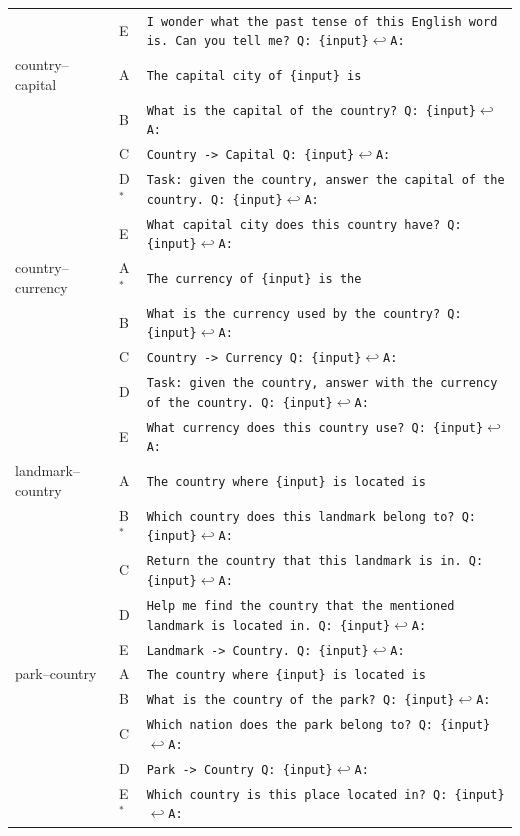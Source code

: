 {\begin{longtable}{@{}ll>{\raggedright\arraybackslash}p{}@{}}
 & E & \texttt{I wonder what the past tense of this English word is. Can you tell me? Q: \{input\}$\hookleftarrow$A:} \\[3pt]
country--capital & A & \texttt{The capital city of \{input\} is} \\
 & B & \texttt{What is the capital of the country? Q: \{input\}$\hookleftarrow$A:} \\
 & C & \texttt{Country -> Capital Q: \{input\}$\hookleftarrow$A:} \\
 & D$^\ast$ & \texttt{Task: given the country, answer the capital of the country. Q: \{input\}$\hookleftarrow$A:} \\
 & E & \texttt{What capital city does this country have? Q: \{input\}$\hookleftarrow$A:} \\[3pt]
country--currency & A$^\ast$ & \texttt{The currency of \{input\} is the} \\
 & B & \texttt{What is the currency used by the country? Q: \{input\}$\hookleftarrow$A:} \\
 & C & \texttt{Country -> Currency Q: \{input\}$\hookleftarrow$A:} \\
 & D & \texttt{Task: given the country, answer with the currency of the country. Q: \{input\}$\hookleftarrow$A:} \\
 & E & \texttt{What currency does this country use? Q: \{input\}$\hookleftarrow$A:} \\[3pt]
landmark--country & A & \texttt{The country where \{input\} is located is} \\
 & B$^\ast$ & \texttt{Which country does this landmark belong to? Q: \{input\}$\hookleftarrow$A:} \\
 & C & \texttt{Return the country that this landmark is in. Q: \{input\}$\hookleftarrow$A:} \\
 & D & \texttt{Help me find the country that the mentioned landmark is located in. Q: \{input\}$\hookleftarrow$A:} \\
 & E & \texttt{Landmark -> Country. Q: \{input\}$\hookleftarrow$A:} \\[3pt]
park--country & A & \texttt{The country where \{input\} is located is} \\
 & B & \texttt{What is the country of the park? Q: \{input\}$\hookleftarrow$A:} \\
 & C & \texttt{Which nation does the park belong to? Q: \{input\}$\hookleftarrow$A:} \\
 & D & \texttt{Park -> Country Q: \{input\}$\hookleftarrow$A:} \\
 & E$^\ast$ & \texttt{Which country is this place located in? Q: \{input\}$\hookleftarrow$A:} \\[3pt]

\end{longtable}}
